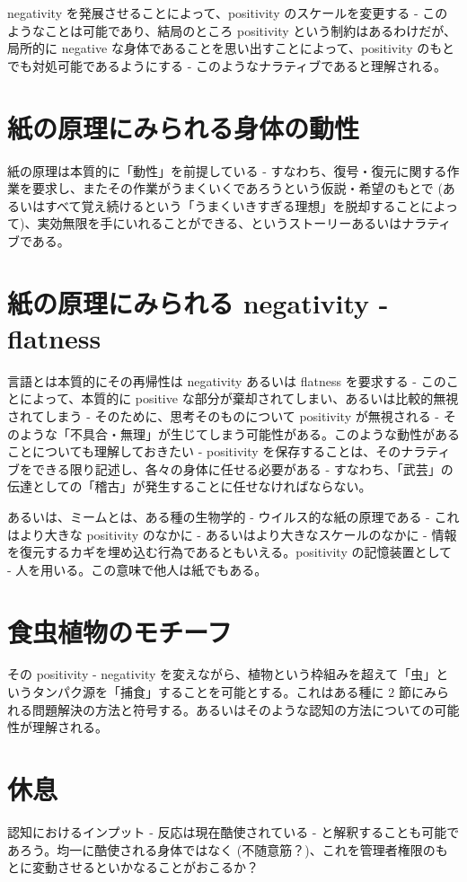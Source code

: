 \documentclass{jsarticle}
\theoremstyle{break}
\begin{document}
negativity を発展させることによって、positivity のスケールを変更する - このようなことは可能であり、結局のところ positivity という制約はあるわけだが、局所的に negative な身体であることを思い出すことによって、positivity のもとでも対処可能であるようにする - このようなナラティブであると理解される。

\section{紙の原理にみられる身体の動性}
紙の原理は本質的に「動性」を前提している - すなわち、復号・復元に関する作業を要求し、またその作業がうまくいくであろうという仮説・希望のもとで (あるいはすべて覚え続けるという「うまくいきすぎる理想」を脱却することによって)、実効無限を手にいれることができる、というストーリーあるいはナラティブである。

\section{紙の原理にみられる negativity - flatness}
言語とは本質的にその再帰性は negativity あるいは flatness を要求する - このことによって、本質的に positive な部分が棄却されてしまい、あるいは比較的無視されてしまう - そのために、思考そのものについて positivity が無視される - そのような「不具合・無理」が生じてしまう可能性がある。このような動性があることについても理解しておきたい - positivity を保存することは、そのナラティブをできる限り記述し、各々の身体に任せる必要がある - すなわち、「武芸」の伝達としての「稽古」が発生することに任せなければならない。

あるいは、ミームとは、ある種の生物学的 - ウイルス的な紙の原理である - これはより大きな positivity のなかに - あるいはより大きなスケールのなかに - 情報を復元するカギを埋め込む行為であるともいえる。positivity の記憶装置として - 人を用いる。この意味で他人は紙でもある。

\section{食虫植物のモチーフ}
その positivity - negativity を変えながら、植物という枠組みを超えて「虫」というタンパク源を「捕食」することを可能とする。これはある種に 2 節にみられる問題解決の方法と符号する。あるいはそのような認知の方法についての可能性が理解される。

\section{休息}
認知におけるインプット - 反応は現在酷使されている - と解釈することも可能であろう。均一に酷使される身体ではなく (不随意筋？)、これを管理者権限のもとに変動させるといかなることがおこるか？
\end{document}
